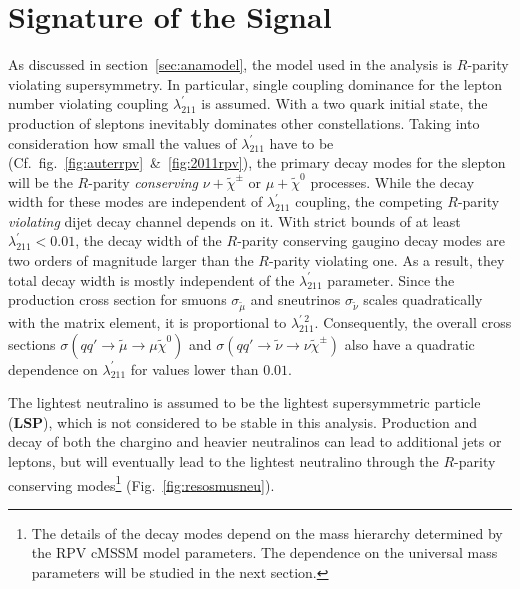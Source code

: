 \chapter{Signature of the Signal}
\label{cha:sig}

As discussed in section~\ref{sec:anamodel}, the model used in the analysis is $R$-parity violating supersymmetry. In particular, single coupling dominance for the lepton number violating coupling $\lambda^\prime_{211}$ is assumed. With a two quark initial state, the production of sleptons inevitably dominates other constellations. Taking into consideration how small the values of $\lambda^\prime_{211}$ have to be (Cf.~fig.~\ref{fig:auterrpv}~\&~\ref{fig:2011rpv}), the primary decay modes for the slepton will be the $R$-parity \textit{conserving} $\nu + \tilde{\chi}^\pm$ or $\mu + \tilde{\chi}^0$ processes. While the decay width for these modes are independent of $\lambda^\prime_{211}$ coupling, the competing $R$-parity \textit{violating} dijet decay channel depends on it. With strict bounds of at least $\lambda^\prime_{211} < 0.01$, the decay width of the $R$-parity conserving gaugino decay modes are two orders of magnitude larger than the $R$-parity violating one. As a result, they total decay width is mostly independent of the $\lambda^\prime_{211}$ parameter. Since the production cross section for smuons $\sigma_{\tilde{\mu}}$ and sneutrinos $\sigma_{\tilde{\nu}}$ scales quadratically with the matrix element, it is proportional to $\lambda^{\prime\:2}_{211}$. Consequently, the overall cross sections $\sigma(qq' \rightarrow \tilde{\mu} \rightarrow \mu\tilde{\chi}^0)$ and $\sigma(qq' \rightarrow \tilde{\nu} \rightarrow \nu\tilde{\chi}^\pm)$ also have a quadratic dependence on $\lambda^\prime_{211}$ for values lower than $0.01$.

The lightest neutralino is assumed to be the lightest supersymmetric particle (\textbf{LSP}), which is not considered to be stable in this analysis. Production and decay of both the chargino and heavier neutralinos can lead to additional jets or leptons, but will eventually lead to the lightest neutralino through the $R$-parity conserving modes\footnote{The details of the decay modes depend on the mass hierarchy determined by the RPV cMSSM model parameters. The dependence on the universal mass parameters will be studied in the next section.} (Fig.~\ref{fig:resosmusneu}). 

